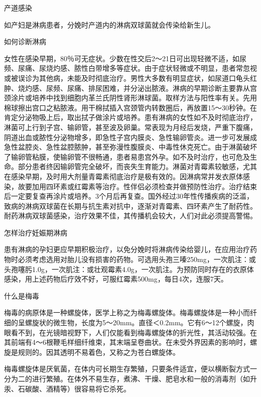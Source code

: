 \documentclass[12pt,UTF8]{ctexbook}
\begin{document}
产道感染

如产妇是淋病患者，分娩时产道内的淋病双球菌就会传染给新生儿。





如何诊断淋病


女性在感染早期，80％可无症状。少数在性交后2～21日可出现轻微不适，如尿频、尿痛、尿烧灼感、脓性白带增多等症状。由于症状轻微或不明显，患者常忽视或被误诊为其他病，未能及时彻底治疗。男性大多数有明显症状，如尿道口龟头红肿、烧灼感、尿频、尿痛、排尿困难，并分泌出脓液。淋病的早期诊断主要靠从宫颈涂片或培养中找到细胞内革兰氏阴性肾形淋球菌。取样方法与阳性率有关。先用棉球擦出宫口之粘脓液。用干棉拭插入宫颈管内转数圈后，再放置15～30秒钟。在肯定分泌物吸上后，取出拭子做涂片或培养。患有淋病的女性如不及时彻底治疗，淋菌可上行到子宫、输卵管，甚至波及卵巢。常表现为月经后发烧，严重下腹痛，阴道出血或脓性分泌物增多，即急性子宫内膜炎、急性输卵管炎。进一步可发展成急性盆腔炎、急性盆腔脓肿，甚至弥漫性腹膜炎、中毒性休克死亡。由于淋菌破坏了输卵管粘膜，使输卵管不很畅通，患者易患宫外孕。如不及时治疗，也可危及生命。部分患者终因输卵管完全破坏，而丧失生育能力。淋菌对青霉素较敏感，尤其在感染早期，及时用大剂量青霉素彻底治疗是极有效的。因淋病常并发衣原体感染，故要加用四环素或红霉素等治疗。性伴侣必须检查并做预防性治疗。治疗结束后一定要复查再涂片或培养。3个月后再复查。国外经过30年性传播疾病的泛滥，致病的淋病双球菌在长期与抗生素对抗中，逐渐对青霉素、四环素产生了耐药性。耐药淋病双球菌感染，治疗效果不佳，其传播机会较大，人们对此必须提高警惕。





怎样治疗妊娠期淋病


患有淋病的孕妇更应早期积极治疗，以免分娩时将淋病传染给婴儿，在应用治疗药物时必须考虑选用对胎儿没有损害的药物。可选用头孢三嗪250mg，一次肌注：或头孢噻肟1.0g，一次肌注：或壮观霉素4.0g，一次肌注。为预防同时存在的衣原体感染，用上述药物后疗效不好，可服红霉素500mg，每日4次，连服7天。





什么是梅毒


梅毒的病原体是一种螺旋体，医学上称之为梅毒螺旋体。梅毒螺旋体是一种小而纤细的呈螺旋状的微生物，长度为5～20mm。直径＜0.2mm。它有6～12个螺旋，肉眼看不到，在光镜暗视野下，人们仅能看到梅毒螺旋体的折光性，其活动较强。在其前端有4～6根鞭毛样细纤维束，其末端呈卷曲状。在未受外界因素的影响时，螺旋是规则的。因其透明不易着色，又称之为苍白螺旋体。

梅毒螺旋体是厌氧菌，在体内可长期生存繁殖，只要条件适宜，便以横断裂方式一分为二的进行繁殖。在体外不易生存，煮沸、干燥、肥皂水和一般的消毒剂（如升汞、石碳酸、酒精等）很容易将它杀死。
\end{document}
